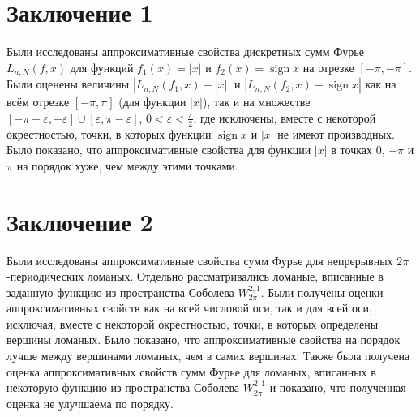 \documentclass[12pt]{article}
\DeclareMathOperator*{\sign}{sign}
\begin{document}
\section{Заключение 1}
Были исследованы аппроксимативные свойства дискретных сумм Фурье $L_{n,N}(f,x)$ для функций
$f_1(x) = |x|$ и $f_2(x) = \sign x$ на отрезке $[-\pi, -\pi]$. Были оценены величины
$|L_{n,N}(f_1,x) - |x||$
и
$|L_{n,N}(f_2,x) - \sign x|$ как на всём отрезке $[-\pi,\pi]$ (для функции $|x|$), так и на множестве $[-\pi+\varepsilon, -\varepsilon]\cup[\varepsilon,\pi-\varepsilon]$,
$0 < \varepsilon < \frac{\pi}{2}$, где исключены, вместе с некоторой окрестностью, точки, в которых функции $\sign x$ и $|x|$ не имеют производных. Было показано, что аппроксимативные свойства для функции $|x|$ в точках $0$, $-\pi$ и $\pi$ на порядок хуже, чем между этими точками.

\section{Заключение 2}
Были исследованы аппроксимативные свойства сумм Фурье для непрерывных $2\pi$-периодических ломаных. Отдельно рассматривались ломаные, вписанные в заданную функцию из пространства Соболева $W_{2\pi}^{2,1}$. Были получены оценки аппроксимативных свойств как на всей числовой оси, так и для всей оси, исключая, вместе с некоторой окрестностью, точки, в которых определены вершины ломаных. Было показано, что аппроксимативные свойства на порядок лучше между вершинами ломаных, чем в самих вершинах.
Также была получена оценка аппроксимативных свойств сумм Фурье для ломаных, вписанных в некоторую функцию из пространства Соболева $W_{2\pi}^{2,1}$ и показано, что полученная оценка не улучшаема по порядку.
\end{document}
